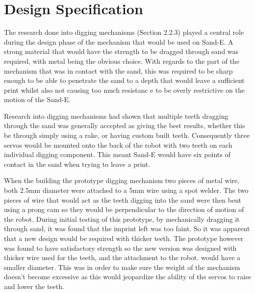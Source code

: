 
\chapter{Design Specification}\label{design specification}\label{section \thechapter}



        The research done into digging mechanisms (Section 2.2.3) played a central role during the design phase of the mechanism that            would be used on Sand-E. A strong material that would have the strength to be dragged through sand was required, with metal being         the obvious choice. With regards to the part of the mechanism that was in contact with the sand, this was required to be sharp           enough to be able to penetrate the sand to a depth that would leave a sufficient print whilst also not causing too much resistanc         e to be overly restrictive on the motion of the Sand-E.

        Research into digging mechanisms had shown that multiple teeth dragging through the sand was generally accepted as giving the            best results, whether this be through simply using a rake, or having custom built teeth. Consequently three servos would be              mounted onto the back of the robot with two teeth on each individual digging component. This meant Sand-E would have six points          of contact in the sand when trying to leave a print.
        
        When the building the prototype digging mechanism two pieces of metal wire, both 2.5mm diameter were attached to a 5mm wire using         a spot welder. The two pieces of wire that would act as the teeth digging into the sand were then bent using a prong cam so they         would be perpendicular to the direction of motion of the robot. During initial testing of this prototype, by mechanically                dragging it through sand, it was found that the imprint left was too faint. So it was apparent that a new design would be                required with thicker teeth. The prototype however was found to have satisfactory strength so the new version was designed with          thicker wire used for the teeth, and the attachment to the robot. would have a smaller diameter. This was in order to make sure          the weight of the mechanism doesn’t become excessive as this would jeopardize the ability of the servos to raise and lower the           teeth.
        
